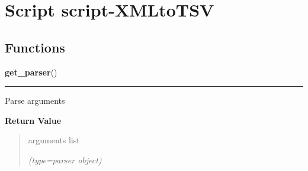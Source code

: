 %
%
%


\section{Script script-XMLtoTSV}

    \label{script-XMLtoTSV}


  \subsection{Functions}

    \label{script-XMLtoTSV:get_parser}

    \vspace{0.5ex}

\hspace{.8\funcindent}\begin{boxedminipage}{\funcwidth}

    \raggedright \textbf{get\_parser}()

    \vspace{-1.5ex}

    \rule{\textwidth}{0.5\fboxrule}
\setlength{\parskip}{2ex}
    Parse arguments

\setlength{\parskip}{1ex}
      \textbf{Return Value}
    \vspace{-1ex}

      \begin{quote}
      arguments list

      {\it (type=parser object)}

      \end{quote}

    \end{boxedminipage}

    \label{script-XMLtoTSV:node_to_tsv}

